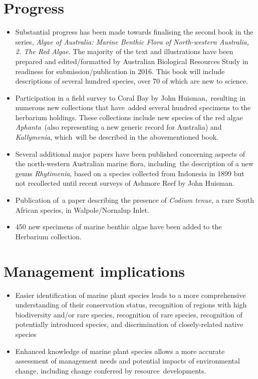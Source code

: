 \documentclass[version=last,
    paper=a4, %
    10pt, %
    usenames,
    dvipsnames,
    oneside, %
    headings=openany, %
    DIV=15 %
]{scrbook}
\begin{document}
\section*{Progress}
\begin{itemize}
\itemsep1pt\parskip0pt
\item
  Substantial progress has been made towards finalising the second book
  in the series, \emph{Algae of Australia: Marine Benthic Flora of
  North-western Australia, 2. The Red Algae}. The majority of the text
  and illustrations have been prepared and edited/formatted by
  Australian Biological Resources Study in readiness for
  submission/publication in 2016. This book will include descriptions of
  several hundred species, over 70 of which are new to science.
\item
  Participation in a field survey to Coral Bay by John
  Huisman,~resulting in numerous new collections that have~added several
  hundred specimens to the herbarium holdings. These collections include
  new species of the red algae \emph{Aphanta}~(also representing a new
  generic record for Australia) and \emph{Kallymenia}, which~will be
  described in the abovementioned book.
\item
  Several additional major papers have been published concerning aspects
  of the north-western Australian marine flora, including~the
  description of a new genus \emph{Rhytimenia}, based on a species
  collected from Indonesia in 1899 but not recollected until recent
  surveys of Ashmore Reef by John Huisman.
\item
  Publication of~a paper describing the presence of \emph{Codium tenue},
  a rare South African species, in Walpole/Nornalup Inlet.~
\item
  450 new specimens of marine benthic algae have been added to the
  Herbarium collection.
\end{itemize}



\section*{Management implications}
\begin{itemize}
\itemsep1pt\parskip0pt
\item
  Easier identification of marine plant species leads to a more
  comprehensive understanding of their conservation status, recognition
  of regions with high biodiversity and/or rare species, recognition of
  rare species, recognition of potentially introduced species, and
  discrimination of closely-related native species
\item
  Enhanced knowledge of marine plant species allows a more accurate
  assessment of management needs and potential impacts of environmental
  change, including change conferred by resource~developments.
\end{itemize}
\end{document}
